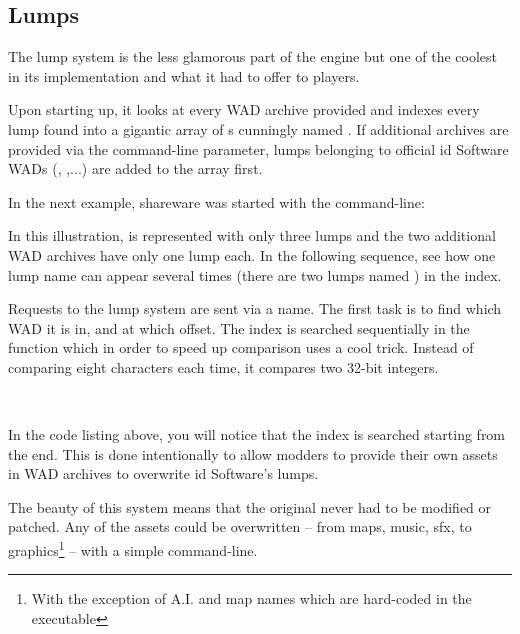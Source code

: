 \subsection{Lumps} \label{wad_detailled}
The lump system is the less glamorous part of the engine but one of the coolest in its implementation and what it had to offer to players.\\
\par
Upon starting up, it looks at every WAD archive provided and indexes every lump found into a gigantic array of s cunningly named . 
If additional archives are provided via the  command-line parameter, lumps belonging to official id Software WADs (, ,...) are added to the  array first.\\
\par
In the next example, shareware \doom{} was started with the command-line:\\
\par
{}
\par
In this illustration,  is represented with only three lumps and the two additional WAD archives have only one lump each. In the following sequence, see how one lump name can appear several times (there are two lumps named ) in the index.\\
\par
{}
\par
Requests to the lump system are sent via a  name. The first task is to find which WAD it is in, and at which offset. The index is searched sequentially in the function  which in order to speed up comparison uses a cool trick. Instead of comparing eight characters each time, it compares two 32-bit integers.\\
\par
{}\\
\par
In the code listing above, you will notice that the index is searched starting from the end. This is done intentionally to allow modders to provide their own assets in WAD archives to overwrite id Software's lumps.\\
\par
The beauty of this system means that the original  never had to be modified or patched. Any of the assets could be overwritten -- from maps, music, sfx, to graphics\footnote{With the exception of A.I. and map names which are hard-coded in the executable} -- with a simple command-line.\\
